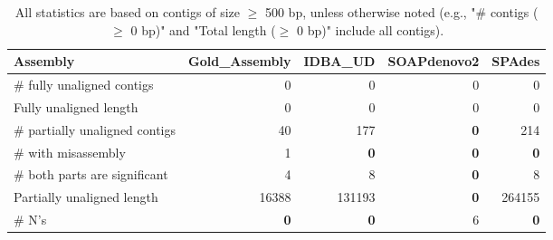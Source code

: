 \documentclass[12pt,a4paper]{article}
\begin{document}
\begin{table}[ht]
\begin{center}
\caption{All statistics are based on contigs of size $\geq$ 500 bp, unless otherwise noted (e.g., "\# contigs ($\geq$ 0 bp)" and "Total length ($\geq$ 0 bp)" include all contigs).}
\begin{tabular}{|l*{4}{|r}|}
\hline
Assembly & Gold\_Assembly & IDBA\_UD & SOAPdenovo2 & SPAdes \\ \hline
\# fully unaligned contigs & 0 & 0 & 0 & 0 \\ \hline
Fully unaligned length & 0 & 0 & 0 & 0 \\ \hline
\# partially unaligned contigs & 40 & 177 & {\bf 0} & 214 \\ \hline
\hspace{5mm}\# with misassembly & 1 & {\bf 0} & {\bf 0} & {\bf 0} \\ \hline
\hspace{5mm}\# both parts are significant & 4 & 8 & {\bf 0} & 8 \\ \hline
Partially unaligned length & 16388 & 131193 & {\bf 0} & 264155 \\ \hline
\# N's & {\bf 0} & {\bf 0} & 6 & {\bf 0} \\ \hline
\end{tabular}
\end{center}
\end{table}
\end{document}
